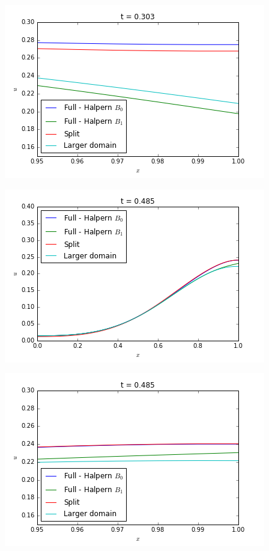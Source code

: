 \begin{minipage}{\textwidth}
\begin{minipage}{.5\textwidth}
	\end{minipage}
	\begin{minipage}{.5\linewidth}
		\includegraphics[scale=.48]{figures/firstCase2Detail.png}	
	\end{minipage}
	\begin{minipage}{.5\textwidth} 
		\includegraphics[scale=.48]{figures/firstCase3.png}	
	\end{minipage}
	\begin{minipage}{.5\linewidth}
		\includegraphics[scale=.48]{figures/firstCase3Detail.png}	

\end{minipage}
\end{minipage}
